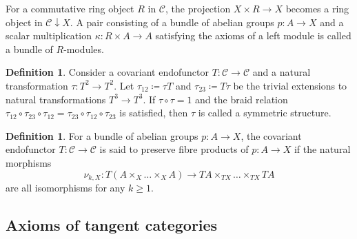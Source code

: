 \documentclass{amsart}
\theoremstyle{definition}
\newtheorem{defn}[thm]{Definition}
\begin{document}
For a commutative ring object $R$ in $\mathcal{C}$, the projection $X \times R \to X$ becomes a ring object in $\mathcal{C} \downarrow X$.
A pair consisting of a bundle of abelian groups $p\colon A \to X$ and a scalar multiplication $\kappa\colon R \times A \to A$ satisfying the axioms of a left module is called a bundle of $R$-modules.

\begin{defn}\label{def:symmetric-structure}
  Consider a covariant endofunctor $T\colon \mathcal{C} \to \mathcal{C}$ and a natural transformation $\tau\colon T^2 \to T^2$.
  Let $\tau_{12} \coloneqq \tau T$ and $\tau_{23} \coloneqq T \tau$ be the trivial extensions to natural transformations $T^3 \to T^3$.
  If $\tau \circ \tau = 1$ and the braid relation
  $\tau_{12} \circ \tau_{23} \circ \tau_{12} = \tau_{23} \circ \tau_{12} \circ \tau_{23}$
  is satisfied, then $\tau$ is called a symmetric structure.
\end{defn}

\begin{defn}\label{def:preserves-fiber-products}
  For a bundle of abelian groups $p\colon A \to X$, the covariant endofunctor $T\colon \mathcal{C} \to \mathcal{C}$ is said to preserve fibre products of $p\colon A \to X$ if the natural morphisms
  $$
    \nu_{k,X} \colon T(A \times_X \dots \times_X A)
      \to TA \times_{TX} \dots \times_{TX} TA
  $$
  are all isomorphisms for any $k \geq 1$.
\end{defn}

\subsection{Axioms of tangent categories}\label{sec:RosickysAxioms}
\end{document}
